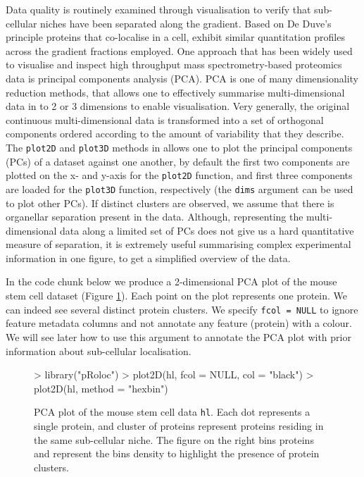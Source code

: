 Data quality is routinely examined through visualisation to verify
that sub-cellular niches have been separated along the gradient. Based
on De Duve's principle \cite{DeDuve:1981} proteins that co-localise in
a cell, exhibit similar quantitation profiles across the gradient
fractions employed. One approach that has been widely used to
visualise and inspect high throughput mass spectrometry-based
proteomics data is principal components analysis (PCA). PCA is one of
many dimensionality reduction methods, that allows one to effectively
summarise multi-dimensional data in to 2 or 3 dimensions to enable
visualisation. Very generally, the original continuous
multi-dimensional data is transformed into a set of orthogonal
components ordered according to the amount of variability that they
describe. The \texttt{plot2D} and \texttt{plot3D} methods in
 allows one to plot the principal components (PCs) of
a dataset against one another, by default the first two components are
plotted on the x- and y-axis for the \texttt{plot2D} function, and
first three components are loaded for the \texttt{plot3D} function,
respectively (the \texttt{dims} argument can be used to plot other
PCs). If distinct clusters are observed, we assume that there is
organellar separation present in the data. Although, representing the
multi-dimensional data along a limited set of PCs does not give us a
hard quantitative measure of separation, it is extremely useful
summarising complex experimental information in one figure, to get a
simplified overview of the data.

In the code chunk below we produce a 2-dimensional PCA plot of the
mouse stem cell dataset (Figure \ref{fig:pcahl}). Each point on the
plot represents one protein. We can indeed see several distinct
protein clusters. We specify \texttt{fcol = NULL} to ignore feature
metadata columns and not annotate any feature (protein) with a
colour. We will see later how to use this argument to annotate the PCA
plot with prior information about sub-cellular localisation.

\begin{figure}[!ht]
  \centering
\begin{Schunk}
\begin{Sinput}
> library("pRoloc")
> plot2D(hl, fcol = NULL, col = "black")
> plot2D(hl, method = "hexbin")
\end{Sinput}
\end{Schunk}
\caption{PCA plot of the mouse stem cell data \texttt{hl}. Each dot
  represents a single protein, and cluster of proteins represent
  proteins residing in the same sub-cellular niche. The figure on the
  right bins proteins and represent the bins density to highlight the
  presence of protein clusters. }
  \label{fig:pcahl}
\end{figure}

